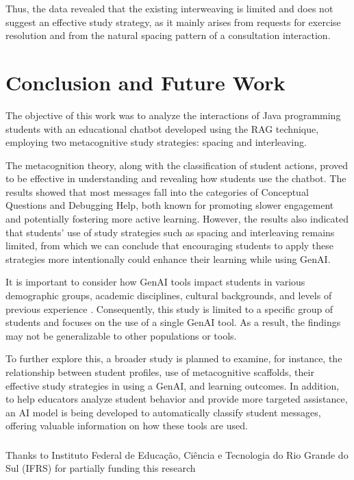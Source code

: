 \documentclass[runningheads]{llncs}
\begin{document}
Thus, the data revealed that the existing interweaving is limited and does not
suggest an effective study strategy, as it mainly arises from requests for
exercise resolution and from the natural spacing pattern of a consultation
interaction.

\section{Conclusion and Future Work}

The objective of this work was to analyze the interactions of Java programming
students with an educational chatbot developed using the RAG technique, employing
two metacognitive study strategies: spacing and interleaving.

The metacognition theory, along with the classification of student actions,
proved to be effective in understanding and revealing how students use the chatbot.
The results showed that most messages fall into the categories of Conceptual
Questions and Debugging Help, both known for promoting slower engagement and
potentially fostering more active learning. However, the results also indicated
that students' use of study strategies such as spacing and interleaving remains
limited, from which we can conclude that encouraging students to apply these
strategies more intentionally could enhance their learning while using GenAI.

It is important to consider how GenAI tools impact students in various
demographic groups, academic disciplines, cultural backgrounds, and levels of
previous experience \cite{catalan21} \cite{neo22}. Consequently, this study is
limited to a specific group of students and focuses on the use of a single GenAI
tool. As a result, the findings may not be generalizable to other populations or
tools.

To further explore this, a broader study is planned to examine, for instance,
the relationship between student profiles, use of metacognitive scaffolds, their
effective study strategies in using a GenAI, and learning outcomes.
In addition, to help educators analyze student behavior and provide
more targeted assistance, an AI model is being developed to automatically
classify student messages, offering valuable information on how these tools are
used.

\begin{credits}
\subsubsection{\ackname}
Thanks to Instituto Federal de Educação, Ciência e Tecnologia do Rio Grande do
Sul (IFRS) for partially funding this research
\end{credits}
%
%
%


\end{document}
